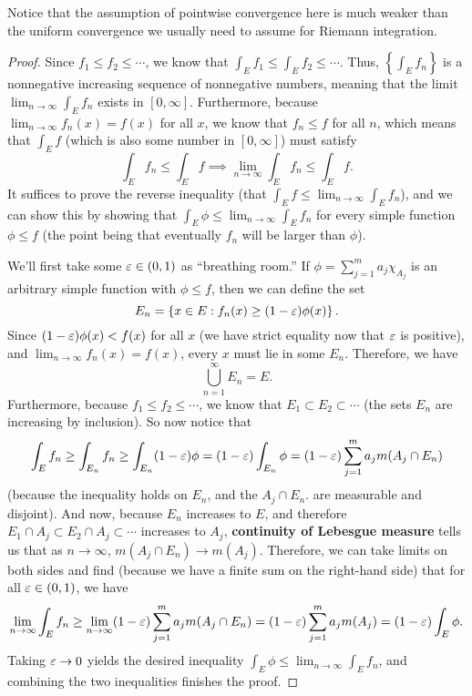Notice that the assumption of pointwise convergence here is much weaker than the uniform convergence we usually need to assume for Riemann integration.

\begin{proof}
Since $f_1 \le f_2 \le \cdots$, we know that $\int_E f_1 \le \int_E f_2 \le \cdots$. Thus, $\left\{\int_E f_n\right\}$ is a nonnegative increasing sequence of nonnegative numbers, meaning that the limit $\lim_{n \to \infty} \int_E f_n$ exists in $[0, \infty]$. Furthermore, because $\lim_{n \to \infty} f_n(x) = f(x)$ for all $x$, we know that $f_n \le f$ for all $n$, which means that $\int_E f$ (which is also some number in $[0, \infty]$) must satisfy 
\[
    \int_E f_n \le \int_E f \implies \lim_{n \to \infty}\int_E f_n \le \int_E f.
\]
It suffices to prove the reverse inequality (that $\int_E f \le \lim_{n \to \infty}\int_E f_n$), and we can show this by showing that $\int_E \phi \le \lim_{n \to \infty}\int_E f_n$ for every simple function $\phi \le f$ (the point being that eventually $f_n$ will be larger than $\phi$). 

We'll first take some $\varepsilon \in (0, 1)$ as ``breathing room.'' If $\phi = \sum_{j=1}^m a_j \chi_{A_j}$ is an arbitrary simple function with $\phi \le f$, then we can define the set
\[
    E_n = \left\{x \in E: f_n(x) \ge (1- \varepsilon) \phi(x)\right\}.
\]
Since $(1 - \varepsilon) \phi(x) < f(x)$ for all $x$ (we have strict equality now that $\varepsilon$ is positive), and $\lim_{n \to \infty} f_n(x) = f(x)$, every $x$ must lie in some $E_n$. Therefore, we have
\[
    \bigcup_{n=1}^{\infty} E_n = E.
\]
Furthermore, because $f_1 \le f_2 \le \cdots$, we know that $E_1 \subset E_2 \subset \cdots$ (the sets $E_n$ are increasing by inclusion). So now notice that
\[
    \int_E f_n \ge \int_{E_n} f_n \ge \int_{E_n} (1 - \varepsilon) \phi = (1-\varepsilon) \int_{E_n} \phi = (1 - \varepsilon) \sum_{j=1}^m a_j m(A_j \cap E_n)
\]
(because the inequality holds on $E_n$, and the $A_j \cap E_n$. are measurable and disjoint). And now, because $E_n$ increases to $E$, and therefore $E_1 \cap A_j \subset E_2 \cap A_j \subset \cdots$ increases to $A_j$, \textbf{continuity of Lebesgue measure} tells us that as $n \to \infty$, $m(A_j \cap E_n) \to m(A_j)$. Therefore, we can take limits on both sides and find (because we have a finite sum on the right-hand side) that for all $\varepsilon \in (0, 1)$, we have
\[
    \lim_{n \to \infty} \int_E f_n \ge \lim_{n \to \infty} (1 - \varepsilon) \sum_{j=1}^m a_j m(A_j \cap E_n) = (1 - \varepsilon) \sum_{j=1}^m a_j m(A_j) = (1 - \varepsilon) \int_E \phi.
\]
Taking $\varepsilon \to 0$ yields the desired inequality $\int_E \phi \le \lim_{n \to \infty } \int_E f_n$, and combining the two inequalities finishes the proof.
\end{proof}


